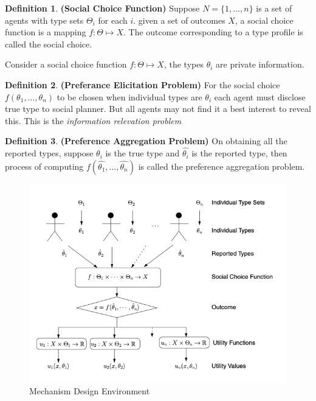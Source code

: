 \documentclass{article}
\theoremstyle{definition}
\newtheorem{defn}{Definition}[section]
\begin{document}
\begin{defn}
\textbf{(Social Choice Function)} Suppose $N = \{1,\dots,n\}$ is a set of agents with type sets $\Theta_i$ for each $i$. given a set of outcomes $X$, a social choice function is a mapping $f:\Theta \mapsto X$. The outcome corresponding to a type profile is called the social choice.
\end{defn}
Consider a social choice function $f:\Theta \mapsto X$, the types $\theta_i$ are private information.
\begin{defn}
\textbf{(Preferance Elicitation Problem)} For the social choice $f(\theta_1,\dots,\theta_n)$ to be chosen when individual types are $\theta_i$ each agent must disclose true type to social planner. But all agents may not find it a best interest to reveal this. This is the \textit{information relevation problem}
\end{defn}
\begin{defn}
\textbf{(Preference Aggregation Problem)} On obtaining all the reported types, suppose $\theta_i$ is the true type and $\hat{\theta_i}$ is the reported type, then process of computing $f(\hat{\theta_1},\dots,\hat{\theta_n})$ is called the preference aggregation problem.
\end{defn}
\begin{figure}[H]
\centering\includegraphics[scale = 0.3]{images/Fig3.png}
\caption{Mechanism Design Environment}
\end{figure}
\end{document}
